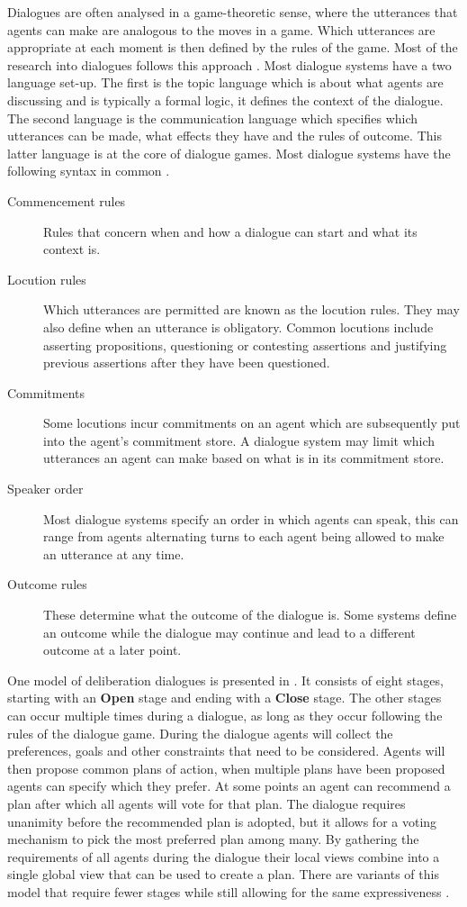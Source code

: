 Dialogues are often analysed in a game-theoretic sense, where the utterances
that agents can make are analogous to the moves in a game. Which utterances are
appropriate at each moment is then defined by the rules of the game. Most of
the research into dialogues follows this approach
\cite{prakken2006,prakken2009}. Most dialogue systems have a two language
set-up. The first is the topic language which is about what agents are
discussing and is typically a formal logic, it defines the context of the
dialogue. The second language is the communication language which specifies
which utterances can be made, what effects they have and the rules of outcome.
This latter language is at the core of dialogue games. Most dialogue systems
have the following syntax in common \cite{prakken2006,prakken2009,mcburney2009}.
\begin{description}
    \item[Commencement rules] Rules that concern when and how a dialogue can
    start and what its context is.
    \item[Locution rules] Which utterances are permitted are known as the
    locution rules. They may also define when an utterance is obligatory.
    Common locutions include asserting propositions, questioning or contesting
    assertions and justifying previous assertions after they have been
    questioned.
    \item[Commitments] Some locutions incur commitments on an agent which are
    subsequently put into the agent's commitment store. A dialogue system may
    limit which utterances an agent can make based on what is in its commitment
    store.
    \item[Speaker order] Most dialogue systems specify an order in which agents
    can speak, this can range from agents alternating turns to each agent being
    allowed to make an utterance at any time.
    \item[Outcome rules] These determine what the outcome of the dialogue is.
    Some systems define an outcome while the dialogue may continue and lead to
    a different outcome at a later point.
\end{description}

One model of deliberation dialogues is presented in \cite{mcburney2007}. It
consists of eight stages, starting with an \textbf{Open} stage and ending with
a \textbf{Close} stage. The other stages can occur multiple times during a
dialogue, as long as they occur following the rules of the dialogue game.
During the dialogue agents will collect the preferences, goals and other
constraints that need to be considered. Agents will then propose common plans
of action, when multiple plans have been proposed agents can specify which they
prefer. At some points an agent can recommend a plan after which all agents
will vote for that plan. The dialogue requires unanimity before the recommended
plan is adopted, but it allows for a voting mechanism to pick the most
preferred plan among many. By gathering the requirements of all agents during
the dialogue their local views combine into a single global view that can be
used to create a plan. There are variants of this model that require fewer
stages while still allowing for the same expressiveness
\cite{dunin-keplicz2011}.

